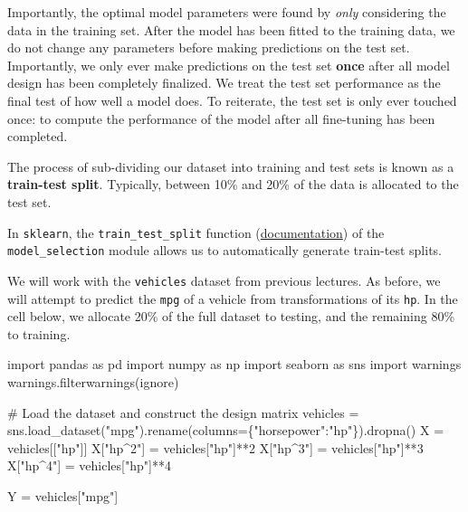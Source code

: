 \documentclass[
  letterpaper,
  DIV=11,
  numbers=noendperiod]{scrreprt}
\newenvironment{Shaded}{\begin{snugshade}}{\end{snugshade}}
\newcommand{\CommentTok}[1]{\textcolor[rgb]{0.37,0.37,0.37}{#1}}
\newcommand{\DecValTok}[1]{\textcolor[rgb]{0.68,0.00,0.00}{#1}}
\newcommand{\ImportTok}[1]{\textcolor[rgb]{0.00,0.46,0.62}{#1}}
\newcommand{\NormalTok}[1]{\textcolor[rgb]{0.00,0.23,0.31}{#1}}
\newcommand{\OperatorTok}[1]{\textcolor[rgb]{0.37,0.37,0.37}{#1}}
\newcommand{\StringTok}[1]{\textcolor[rgb]{0.13,0.47,0.30}{#1}}
\begin{document}
Importantly, the optimal model parameters were found by \emph{only}
considering the data in the training set. After the model has been
fitted to the training data, we do not change any parameters before
making predictions on the test set. Importantly, we only ever make
predictions on the test set \textbf{once} after all model design has
been completely finalized. We treat the test set performance as the
final test of how well a model does. To reiterate, the test set is only
ever touched once: to compute the performance of the model after all
fine-tuning has been completed.

The process of sub-dividing our dataset into training and test sets is
known as a \textbf{train-test split}. Typically, between 10\% and 20\%
of the data is allocated to the test set.

In \texttt{sklearn}, the \texttt{train\_test\_split} function
(\href{https://scikit-learn.org/stable/modules/generated/sklearn.model_selection.train_test_split.html}{documentation})
of the \texttt{model\_selection} module allows us to automatically
generate train-test splits.

We will work with the \texttt{vehicles} dataset from previous lectures.
As before, we will attempt to predict the \texttt{mpg} of a vehicle from
transformations of its \texttt{hp}. In the cell below, we allocate 20\%
of the full dataset to testing, and the remaining 80\% to training.

\begin{Shaded}
\begin{Highlighting}[]
\ImportTok{import}\NormalTok{ pandas }\ImportTok{as}\NormalTok{ pd}
\ImportTok{import}\NormalTok{ numpy }\ImportTok{as}\NormalTok{ np}
\ImportTok{import}\NormalTok{ seaborn }\ImportTok{as}\NormalTok{ sns}
\ImportTok{import}\NormalTok{ warnings}
\NormalTok{warnings.filterwarnings(}\StringTok{\textquotesingle{}ignore\textquotesingle{}}\NormalTok{)}

\CommentTok{\# Load the dataset and construct the design matrix}
\NormalTok{vehicles }\OperatorTok{=}\NormalTok{ sns.load\_dataset(}\StringTok{"mpg"}\NormalTok{).rename(columns}\OperatorTok{=}\NormalTok{\{}\StringTok{"horsepower"}\NormalTok{:}\StringTok{"hp"}\NormalTok{\}).dropna()}
\NormalTok{X }\OperatorTok{=}\NormalTok{ vehicles[[}\StringTok{"hp"}\NormalTok{]]}
\NormalTok{X[}\StringTok{"hp\^{}2"}\NormalTok{] }\OperatorTok{=}\NormalTok{ vehicles[}\StringTok{"hp"}\NormalTok{]}\OperatorTok{**}\DecValTok{2}
\NormalTok{X[}\StringTok{"hp\^{}3"}\NormalTok{] }\OperatorTok{=}\NormalTok{ vehicles[}\StringTok{"hp"}\NormalTok{]}\OperatorTok{**}\DecValTok{3}
\NormalTok{X[}\StringTok{"hp\^{}4"}\NormalTok{] }\OperatorTok{=}\NormalTok{ vehicles[}\StringTok{"hp"}\NormalTok{]}\OperatorTok{**}\DecValTok{4}

\NormalTok{Y }\OperatorTok{=}\NormalTok{ vehicles[}\StringTok{"mpg"}\NormalTok{]}
\end{Highlighting}
\end{Shaded}
\end{document}
